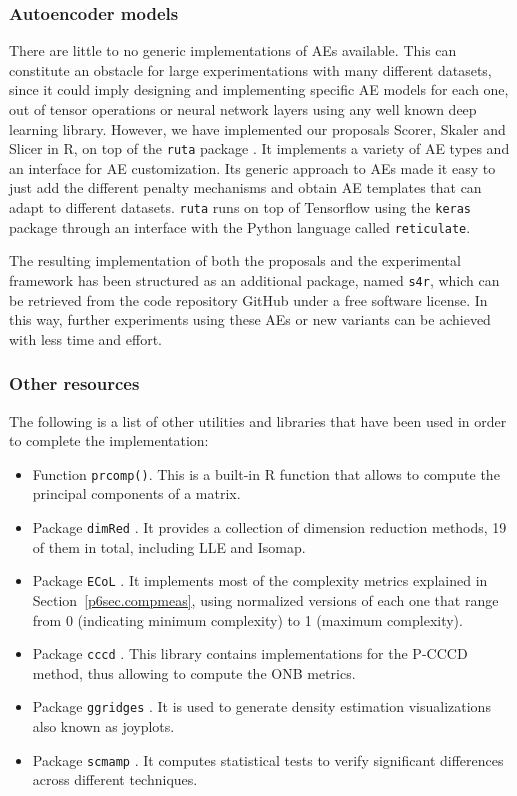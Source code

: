   \subsubsection{Autoencoder models}

  There are little to no generic implementations of AEs available. This can constitute an obstacle for large experimentations with many different datasets, since it could imply designing and implementing specific AE models for each one, out of tensor operations or neural network layers using any well known deep learning library. However, we have implemented our proposals Scorer, Skaler and Slicer in R, on top of the \texttt{ruta} package . It implements a variety of AE types and an interface for AE customization. Its generic approach to AEs made it easy to just add the different penalty mechanisms and obtain AE templates that can adapt to different datasets. \texttt{ruta} runs on top of Tensorflow using the \texttt{keras} package through an interface with the Python language called \texttt{reticulate}.

  The resulting implementation of both the proposals and the experimental framework has been structured as an additional package, named \texttt{s4r}, which can be retrieved from the code repository GitHub under a free software license. In this way, further experiments using these AEs or new variants can be achieved with less time and effort.

  \subsubsection{Other resources}

  The following is a list of other utilities and libraries that have been used in order to complete the implementation:

  \begin{itemize}
    \item Function \texttt{prcomp()}. This is a built-in R function that allows to compute the principal components of a matrix.
    \item Package \texttt{dimRed} . It provides a collection of dimension reduction methods, 19 of them in total, including LLE and Isomap.
    \item Package \texttt{ECoL} . It implements most of the complexity metrics explained in Section~\ref{p6sec.compmeas}, using normalized versions of each one that range from 0 (indicating minimum complexity) to 1 (maximum complexity).
    \item Package \texttt{cccd} . This library contains implementations for the P-CCCD method, thus allowing to compute the ONB metrics.
    \item Package \texttt{ggridges} . It is used to generate density estimation visualizations also known as joyplots.
    \item Package \texttt{scmamp} . It computes statistical tests to verify significant differences across different techniques.
  \end{itemize}
\fi

